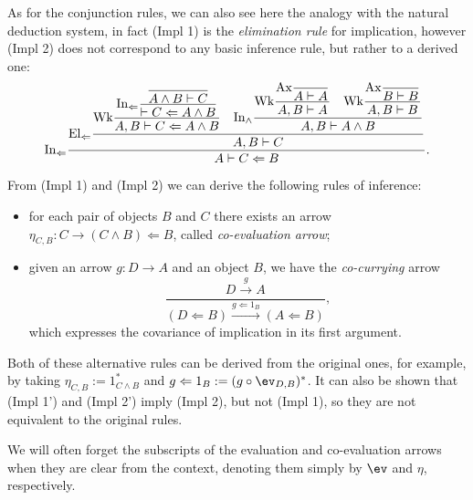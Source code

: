 \begin{remark}
    As for the conjunction rules, we can also see here the analogy with the natural deduction system, in fact (Impl 1) is the \textit{elimination rule} for implication, however (Impl 2) does not correspond to any basic inference rule, but rather to a derived one:
    \[ \textnormal{In}_{\Leftarrow}\frac{\displaystyle\textnormal{El}_{\Leftarrow}\frac{\displaystyle \textnormal{Wk}\frac{\displaystyle \textnormal{In}_{\Leftarrow}\frac{\displaystyle\frac{}{A \land B \vdash C}}{\vdash C \Leftarrow A \land B}}{A,B \vdash C \Leftarrow A \land B} \quad \displaystyle\textnormal{In}_{\land}\frac{\displaystyle\textnormal{Wk}\frac{\displaystyle\textnormal{Ax}\frac{}{A \vdash A}}{A, B \vdash A} \quad \displaystyle\textnormal{Wk}\frac{\displaystyle\textnormal{Ax}\frac{}{B \vdash B}}{A, B \vdash B}}{A, B \vdash A \land B}}{A,B \vdash C}}{A \vdash C \Leftarrow B}. \]
\end{remark}

\begin{remark}
    From (Impl 1) and (Impl 2) we can derive the following rules of inference:
    \begin{itemize}
        \item[(\textnormal{Impl 1'})] for each pair of objects $B$ and $C$ there exists an arrow $\eta_{C,B} : C \to (C \land B) \Leftarrow B$, called \textit{co-evaluation arrow};
        \item[(\textnormal{Impl 2'})] given an arrow $g : D \to A$ and an object $B$, we have the \textit{co-currying} arrow
        \[ \frac{D \xrightarrow{g} A}{(D \Leftarrow B) \xrightarrow{g \Leftarrow 1_B} (A \Leftarrow B)}, \]
    which expresses the covariance of implication in its first argument.   
    \end{itemize}
    Both of these alternative rules can be derived from the original ones, for example, by taking $\eta_{C,B} := 1_{C \land B}^*$ and $g \Leftarrow 1_B := (g \circ \ev_{D,B})^*$. It can also be shown that (Impl 1') and (Impl 2') imply (Impl 2),
    but not (Impl 1), so they are not equivalent to the original rules.
\end{remark}

\begin{notation}
    We will often forget the subscripts of the evaluation and co-evaluation arrows when they are clear from the context, denoting them simply by $\ev$ and $\eta$, respectively.
\end{notation}

